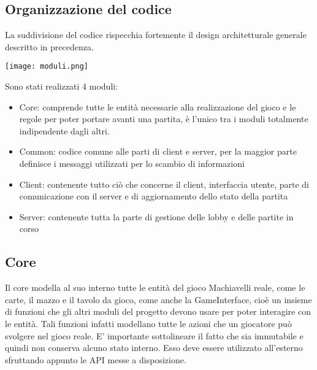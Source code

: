 \subsection{Organizzazione del codice}
La suddivisione del codice rispecchia fortemente il design architetturale generale descritto in precedenza.
\begin{center}
    \texttt{[image: moduli.png]}
\end{center}
Sono stati realizzati 4 moduli:
\begin{itemize}
    \item Core: comprende tutte le entità necessarie alla realizzazione del gioco e le regole per poter portare avanti una partita, è l’unico tra i moduli totalmente indipendente dagli altri.
    \item Common: codice comune alle parti di client e server, per la maggior parte definisce i messaggi utilizzati per lo scambio di informazioni
    \item Client: contenente tutto ciò che concerne il client, interfaccia utente, parte di comunicazione con il server e di aggiornamento dello stato della partita
    \item Server: contenente tutta la parte di gestione delle lobby e delle partite in corso
\end{itemize}

\subsection{Core}
Il core modella al suo interno tutte le entità del gioco Machiavelli reale, come le carte, il mazzo e il tavolo da gioco, come anche la GameInterface, cioè un insieme di funzioni che gli altri moduli del progetto devono usare per poter interagire con le entità.
Tali funzioni infatti modellano tutte le azioni che un giocatore può svolgere nel gioco reale.
\textparagraph E’ importante sottolineare il fatto che sia immutabile e quindi non conserva alcuno stato interno.
Esso deve essere utilizzato all’esterno sfruttando appunto le API messe a disposizione.

